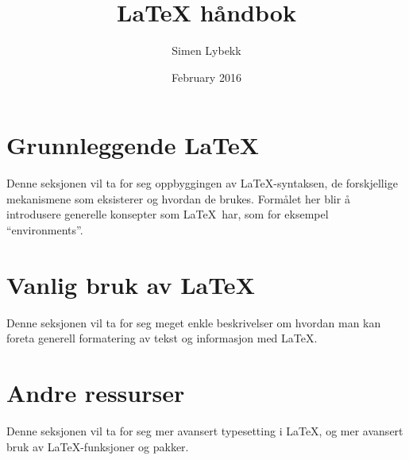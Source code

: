 \documentclass{article}
\author{Simen Lybekk}
\title{LaTeX håndbok}
\date{February 2016}
\begin{document}
\maketitle

\tableofcontents
\clearpage


\section{Grunnleggende \LaTeX}
Denne seksjonen vil ta for seg oppbyggingen av \LaTeX-syntaksen, de forskjellige mekanismene som eksisterer og hvordan de brukes.
Formålet her blir å introdusere generelle konsepter som \LaTeX~har, som for eksempel ``environments''.


\section{Vanlig bruk av \LaTeX}
Denne seksjonen vil ta for seg meget enkle beskrivelser om hvordan man kan foreta generell formatering av tekst og informasjon med \LaTeX.






\section{Andre ressurser}
Denne seksjonen vil ta for seg mer avansert typesetting i \LaTeX, og mer avansert bruk av \LaTeX-funksjoner og pakker.





\end{document}
